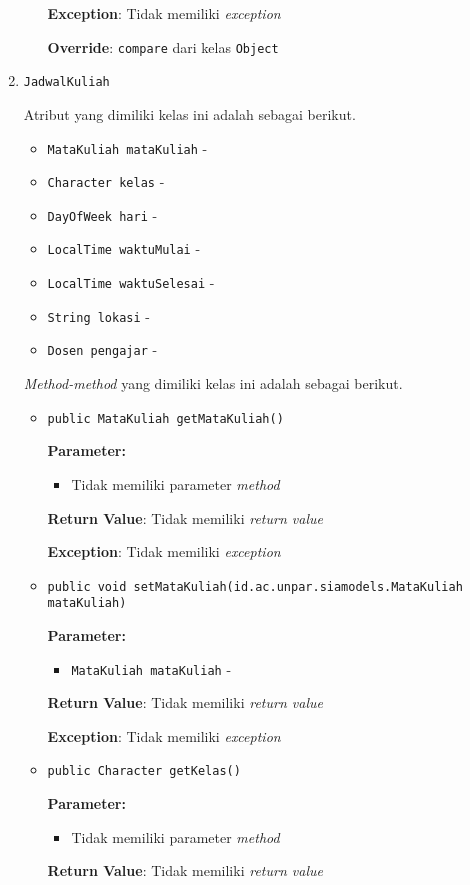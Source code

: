 \documentclass{article}
\begin{document}
\begin{enumerate}
\begin{itemize}
\textbf{Exception}: Tidak memiliki \textit{exception}

\textbf{Override}: \texttt{compare} dari kelas \texttt{Object}

\end{itemize}
\item \texttt{JadwalKuliah}



Atribut yang dimiliki kelas ini adalah sebagai berikut.
\begin{itemize}
\item \texttt{MataKuliah mataKuliah} - 
\item \texttt{Character kelas} - 
\item \texttt{DayOfWeek hari} - 
\item \texttt{LocalTime waktuMulai} - 
\item \texttt{LocalTime waktuSelesai} - 
\item \texttt{String lokasi} - 
\item \texttt{Dosen pengajar} - 
\end{itemize}
\textit{Method-method} yang dimiliki kelas ini adalah sebagai berikut.
\begin{itemize}
\item \texttt{public MataKuliah getMataKuliah()}

\textbf{Parameter:}
\begin{itemize}
\item Tidak memiliki parameter \textit{method}
\end{itemize}
\textbf{Return Value}: Tidak memiliki \textit{return value}

\textbf{Exception}: Tidak memiliki \textit{exception}

\item \texttt{public void setMataKuliah(id.ac.unpar.siamodels.MataKuliah mataKuliah)}

\textbf{Parameter:}
\begin{itemize}
\item \texttt{MataKuliah mataKuliah} - 
\end{itemize}
\textbf{Return Value}: Tidak memiliki \textit{return value}

\textbf{Exception}: Tidak memiliki \textit{exception}

\item \texttt{public Character getKelas()}

\textbf{Parameter:}
\begin{itemize}
\item Tidak memiliki parameter \textit{method}
\end{itemize}
\textbf{Return Value}: Tidak memiliki \textit{return value}


\end{itemize}
\end{enumerate}
\end{document}
